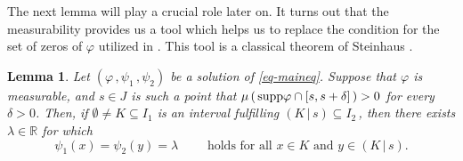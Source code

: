 \documentclass[12pt]{amsart}
\newtheorem{lemm}{Lemma}
\theoremstyle{remark}
\theoremstyle{definition}
\newcommand{\RR}{\mathbb{R}}
\newcommand{\supp}{\mbox{\rm supp}}
\newcommand{\rfl}[2]{\left( #1 \, \vert \, #2 \right)}
\begin{document}
The next lemma will play a crucial role later on. 
It turns out that the measurability provides us a tool 
which helps us to replace the condition for 
the set of zeros of $ \varphi $ utilized in \cite{Kis24}. 
This tool is a classical 
theorem of Steinhaus \cite{Ste20}. 

\begin{lemm}\label{lemm-locally_constant}
Let 
$ \left( \varphi \,, \psi_1 \,, \psi_2 \right) $ 
be a solution of \eqref{eq-maineq}. 
Suppose that $ \varphi $ is measurable, 
and $ s \in J $ is such a point that 
$ \mu \left( \, \supp \varphi \cap 
\left[ s, s + \delta \right] \, \right) > 0 $ 
for every $ \delta > 0 $. 
Then, if $ \emptyset \neq K \subseteq I_1 $ 
is an interval fulfilling 
$ \rfl{K}{s} \subseteq I_2 \, $, then 
there exists $ \lambda \in \RR $ for which 
\[
\psi_1(x) = \psi_2(y) = \lambda 
\qquad \mbox{ holds for all } 
x \in K \mbox{ and } y \in \rfl{K}{s}. 
\]
\end{lemm}
\end{document}
